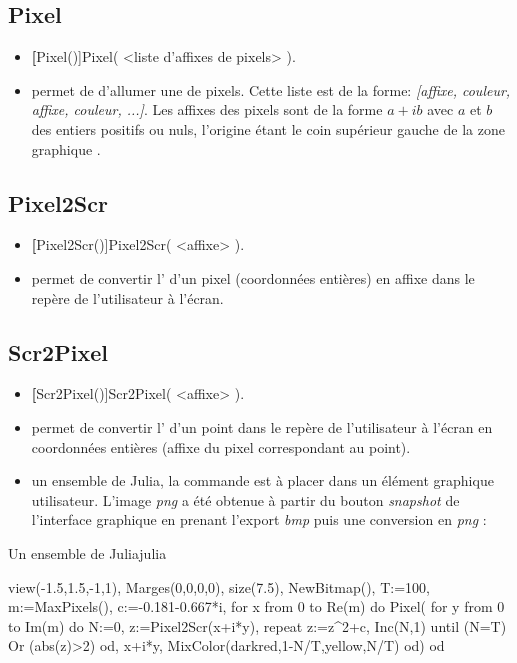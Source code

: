 \subsection{Pixel}\label{cmdPixel}
\begin{itemize}
 \item \util \textbf[Pixel()]{Pixel( <liste d'affixes de pixels> )}.
 \item \desc permet de d'allumer une  de pixels. Cette liste est de la forme: \textsl{[affixe, couleur, affixe, couleur, ...]}. Les affixes des pixels sont de la forme $a+ib$ avec $a$ et $b$ des entiers positifs ou nuls, l'origine étant le coin supérieur gauche de la zone graphique .
\end{itemize}

\subsection{Pixel2Scr}\label{cmdPixel2Scr}
\begin{itemize}
 \item \util \textbf[Pixel2Scr()]{Pixel2Scr( <affixe> )}.
 \item \desc permet de convertir l' d'un pixel (coordonnées entières) en affixe dans le repère de l'utilisateur à l'écran.
\end{itemize}

\subsection{Scr2Pixel}\label{cmdScr2Pixel}
\begin{itemize}
 \item \util \textbf[Scr2Pixel()]{Scr2Pixel( <affixe> )}.
 \item \desc permet de convertir l' d'un point dans le repère de l'utilisateur à l'écran en coordonnées entières (affixe du pixel correspondant au point).
 \item \exem un ensemble de Julia, la commande est à placer dans un élément graphique utilisateur. L'image \textit{png} a été obtenue à partir du bouton \textit{snapshot} de l'interface graphique en prenant l'export \textit{bmp} puis une conversion en \textit{png} :
\end{itemize}

\pngtrue
\begin{demo}{Un ensemble de Julia}{julia}
\begin{texgraph}[name=julia,export=none]
view(-1.5,1.5,-1,1), Marges(0,0,0,0), size(7.5),
NewBitmap(), T:=100, m:=MaxPixels(), c:=-0.181-0.667*i,
for x from 0 to Re(m) do
 Pixel(
   for y from 0 to Im(m) do
     N:=0, z:=Pixel2Scr(x+i*y),
     repeat
       z:=z^2+c, Inc(N,1)
     until (N=T) Or (abs(z)>2) od,
     x+i*y, MixColor(darkred,1-N/T,yellow,N/T)
 od)
od
\end{texgraph}
\end{demo}
\pngfalse

